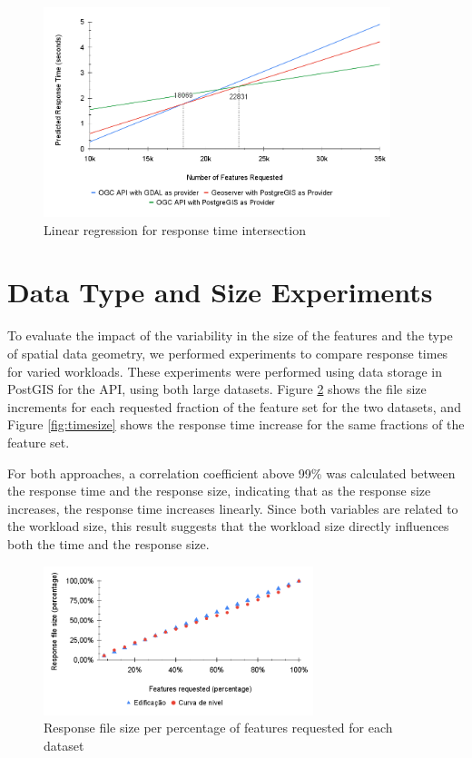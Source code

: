 \begin{figure}[H]
\centering
\includegraphics[width=0.9\textwidth]{img/comparetodos.png}
\caption{Linear regression for response time intersection}
\label{fig:comparetodos}
\end{figure}

\section{Data Type and Size Experiments}

To evaluate the impact of the variability in the size of the features and the type of spatial data geometry, we performed experiments to compare response times for varied workloads. 
These experiments were performed using data storage in PostGIS for the API, using both large datasets. Figure \ref{fig:filesize} shows the file size increments for each requested fraction of the feature set for the two datasets, and Figure \ref{fig:timesize} shows the response time increase for the same fractions of the feature set.

For both approaches, a correlation coefficient above 99\% was calculated between the response time and the response size, indicating that as the response size increases, the response time increases linearly. Since both variables are related to the workload size, this result suggests that the workload size directly influences both the time and the response size.

\begin{figure}[H]
\centering
\includegraphics[width=0.7\textwidth]{img/comparesize.png}
\caption{Response file size per percentage of features requested for each dataset}
\label{fig:filesize}
\end{figure}

